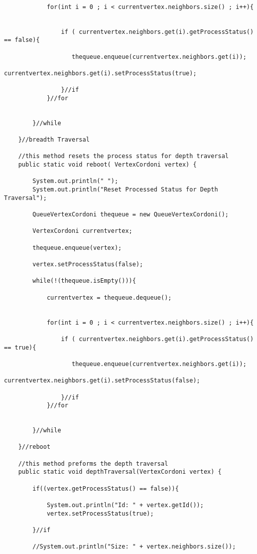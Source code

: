 \documentclass[letterpaper, 10pt,DIV=13]{scrartcl}
\numberwithin{equation}{section} %
\numberwithin{figure}{section} %
\numberwithin{table}{section} %
\begin{document}
\begin{lstlisting}[frame=single, ]
            
            for(int i = 0 ; i < currentvertex.neighbors.size() ; i++){


                if ( currentvertex.neighbors.get(i).getProcessStatus() == false){

                   thequeue.enqueue(currentvertex.neighbors.get(i));
                   currentvertex.neighbors.get(i).setProcessStatus(true);

                }//if
            }//for
            

        }//while

    }//breadth Traversal

    //this method resets the process status for depth traversal 
    public static void reboot( VertexCordoni vertex) {

        System.out.println(" ");
        System.out.println("Reset Processed Status for Depth Traversal");

        QueueVertexCordoni thequeue = new QueueVertexCordoni();

        VertexCordoni currentvertex;
        
        thequeue.enqueue(vertex);

        vertex.setProcessStatus(false);

        while(!(thequeue.isEmpty())){

            currentvertex = thequeue.dequeue();

            
            for(int i = 0 ; i < currentvertex.neighbors.size() ; i++){

                if ( currentvertex.neighbors.get(i).getProcessStatus() == true){

                   thequeue.enqueue(currentvertex.neighbors.get(i));
                   currentvertex.neighbors.get(i).setProcessStatus(false);

                }//if
            }//for
            

        }//while

    }//reboot

    //this method preforms the depth traversal
    public static void depthTraversal(VertexCordoni vertex) {

        if((vertex.getProcessStatus() == false)){

            System.out.println("Id: " + vertex.getId());
            vertex.setProcessStatus(true);

        }//if

        //System.out.println("Size: " + vertex.neighbors.size());


\end{lstlisting}
\end{document}
